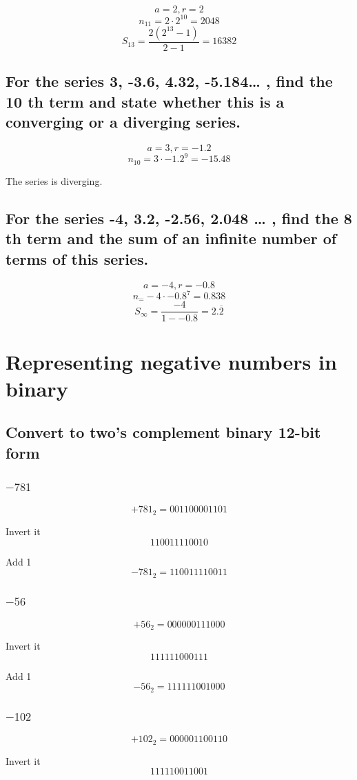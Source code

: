 \documentclass[12pt]{article}
\begin{document}
\[a=2, r=2\]
\[n_{11}=2\cdot2^{10}=2048\]
\[S_{13}=\frac{2(2^{13}-1)}{2-1}=16382\]

\subsection{For the series 3, -3.6, 4.32, -5.184… , find the 10
th term and state whether
this is a converging or a diverging series.}

\[a=3, r=-1.2\]
\[n_{10}=3\cdot-1.2^9=-15.48\]

The series is diverging.

\subsection{For the series -4, 3.2, -2.56, 2.048 … , find the 8
th term and the sum of an
infinite number of terms of this series.}

\[a=-4, r=-0.8\]
\[n_=-4\cdot-0.8^7=0.838\]
\[S_{\infty}=\frac{-4}{1--0.8}=2.\overline{2}\]

\section{Representing negative numbers in binary}

\subsection{Convert to two's complement binary 12-bit form}
\subsubsection{$-781$}
\[+781_2=001100001101\]

Invert it
\[110011110010\]

Add 1
\[-781_2=110011110011\]

\subsubsection{$-56$}
\[+56_2=000000111000\]

Invert it
\[111111000111\]

Add 1
\[-56_2=111111001000\]

\subsubsection{$-102$}
\[+102_2=000001100110\]

Invert it
\[111110011001\]
\end{document}
